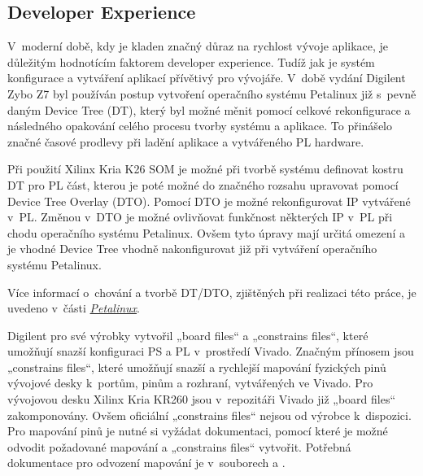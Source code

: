 \documentclass[a4paper, twoside, 11pt]{article}
\begin{document}
			\subsection{Developer Experience}
					V~moderní době, kdy je kladen značný důraz na rychlost vývoje aplikace, je důležitým hodnotícím faktorem developer experience. Tudíž jak je systém konfigurace a vytváření aplikací přívětivý pro vývojáře. V~době vydání Digilent Zybo Z7 byl používán postup vytvoření operačního systému Petalinux již s~pevně daným Device Tree (DT), který byl možné měnit pomocí celkové rekonfigurace a následného opakování celého procesu tvorby systému a aplikace. To přinášelo značné časové prodlevy při ladění aplikace a vytvářeného PL hardware.\par
					Při použití Xilinx Kria K26 SOM je možné při tvorbě systému definovat kostru DT pro PL část, kterou je poté možné do značného rozsahu upravovat pomocí Device Tree Overlay (DTO). Pomocí DTO je možné rekonfigurovat IP vytvářené v~PL. Změnou v~DTO je možné ovlivňovat funkčnost některých IP v~PL při chodu operačního systému Petalinux. Ovšem tyto úpravy mají určitá omezení a je vhodné Device Tree vhodně nakonfigurovat již při vytváření operačního systému Petalinux.\par
					Více informací o~chování a tvorbě DT/DTO, zjištěných při realizaci této práce, je uvedeno v~části \hyperref[subsec:petalinux]{\textit{Petalinux}}.\par
					Digilent pro své výrobky vytvořil „board files“ a „constrains files“, které umožňují snazší konfiguraci PS a PL v~prostředí Vivado. Značným přínosem jsou „constrains files“, které umožňují snazší a rychlejší mapování fyzických pinů vývojové desky k~portům, pinům a rozhraní, vytvářených ve Vivado. Pro vývojovou desku Xilinx Kria KR260 jsou v~repozitáři Vivado již „board files“ zakomponovány. Ovšem oficiální „constrains files“ nejsou od výrobce k~dispozici. Pro mapování pinů je nutné si vyžádat dokumentaci, pomocí které je možné odvodit požadované mapování a „constrains files“ vytvořit. Potřebná dokumentace pro odvození mapování je v~souborech \cite{kria-kr260-starter-kit-cc-schematics} a \cite{kria-k26-som-xdc}.
\end{document}
